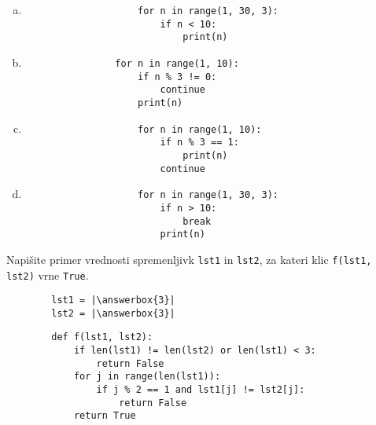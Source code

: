 \documentclass[arhiv, 10pt]{../izpit}
\newcommand{\inlinepy}[1]{\texttt{#1}}
\newcommand{\answerbox}[1]{\framebox{\vphantom{\large M}\hspace{#1cm}}}
\begin{document}
        \begin{multicols}{2}
        \begin{enumerate}[(a)]
\item 
                \begin{verbatim}
                    for n in range(1, 30, 3):
                        if n < 10:
                            print(n)
                \end{verbatim}
            
\item 
            \begin{verbatim}
                for n in range(1, 10):
                    if n % 3 != 0:
                        continue
                    print(n)
            \end{verbatim}
        
\item 
                \begin{verbatim}
                    for n in range(1, 10):
                        if n % 3 == 1:
                            print(n)
                        continue
                \end{verbatim}
            
\item 
                \begin{verbatim}
                    for n in range(1, 30, 3):
                        if n > 10:
                            break
                        print(n)
                \end{verbatim}
            
\end{enumerate}

        \end{multicols}
    
        \naloga*
        \begin{multicols}{2}
        \noindent
        Napišite primer vrednosti spremenljivk \inlinepy{lst1} in \inlinepy{lst2}, za kateri klic \inlinepy{f(lst1, lst2)} vrne \inlinepy{True}.
        \begin{verbatim}
        lst1 = |\answerbox{3}|
        lst2 = |\answerbox{3}|
        \end{verbatim}
        \vfil
        \columnbreak
        \begin{verbatim}
        def f(lst1, lst2):
            if len(lst1) != len(lst2) or len(lst1) < 3:
                return False
            for j in range(len(lst1)):
                if j % 2 == 1 and lst1[j] != lst2[j]:
                    return False
            return True
        \end{verbatim}
        \end{multicols}
    
\end{document}

